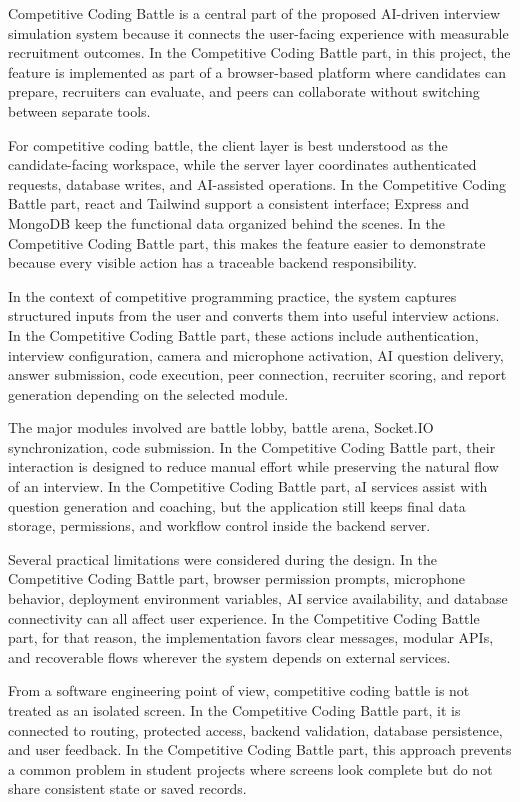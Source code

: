 \documentclass[12pt,a4paper]{report}
\begin{document}
Competitive Coding Battle is a central part of the proposed AI-driven interview simulation system because it connects the user-facing experience with measurable recruitment outcomes. In the Competitive Coding Battle part, in this project, the feature is implemented as part of a browser-based platform where candidates can prepare, recruiters can evaluate, and peers can collaborate without switching between separate tools.


For competitive coding battle, the client layer is best understood as the candidate-facing workspace, while the server layer coordinates authenticated requests, database writes, and AI-assisted operations. In the Competitive Coding Battle part, react and Tailwind support a consistent interface; Express and MongoDB keep the functional data organized behind the scenes. In the Competitive Coding Battle part, this makes the feature easier to demonstrate because every visible action has a traceable backend responsibility.


In the context of competitive programming practice, the system captures structured inputs from the user and converts them into useful interview actions. In the Competitive Coding Battle part, these actions include authentication, interview configuration, camera and microphone activation, AI question delivery, answer submission, code execution, peer connection, recruiter scoring, and report generation depending on the selected module.


The major modules involved are battle lobby, battle arena, Socket.IO synchronization, code submission. In the Competitive Coding Battle part, their interaction is designed to reduce manual effort while preserving the natural flow of an interview. In the Competitive Coding Battle part, aI services assist with question generation and coaching, but the application still keeps final data storage, permissions, and workflow control inside the backend server.


Several practical limitations were considered during the design. In the Competitive Coding Battle part, browser permission prompts, microphone behavior, deployment environment variables, AI service availability, and database connectivity can all affect user experience. In the Competitive Coding Battle part, for that reason, the implementation favors clear messages, modular APIs, and recoverable flows wherever the system depends on external services.


From a software engineering point of view, competitive coding battle is not treated as an isolated screen. In the Competitive Coding Battle part, it is connected to routing, protected access, backend validation, database persistence, and user feedback. In the Competitive Coding Battle part, this approach prevents a common problem in student projects where screens look complete but do not share consistent state or saved records.
\end{document}
